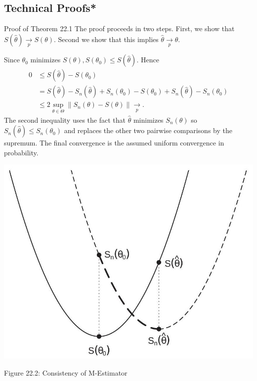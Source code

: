 \documentclass[10pt]{article}
\begin{document}
\subsection{Technical Proofs*}
Proof of Theorem 22.1 The proof proceeds in two steps. First, we show that $S(\widehat{\theta}) \underset{p}{\longrightarrow} S(\theta)$. Second we show that this implies $\widehat{\theta} \underset{p}{\longrightarrow} \theta$.

Since $\theta_{0}$ minimizes $S(\theta), S\left(\theta_{0}\right) \leq S(\widehat{\theta})$. Hence
$$
\begin{aligned}
0 & \leq S(\widehat{\theta})-S\left(\theta_{0}\right) \\
&=S(\widehat{\theta})-S_{n}(\widehat{\theta})+S_{n}\left(\theta_{0}\right)-S\left(\theta_{0}\right)+S_{n}(\widehat{\theta})-S_{n}\left(\theta_{0}\right) \\
& \leq 2 \sup _{\theta \in \Theta}\left\|S_{n}(\theta)-S(\theta)\right\| \underset{p}{\longrightarrow} .
\end{aligned}
$$
The second inequality uses the fact that $\hat{\theta}$ minimizes $S_{n}(\theta)$ so $S_{n}(\widehat{\theta}) \leq S_{n}\left(\theta_{0}\right)$ and replaces the other two pairwise comparisons by the supremum. The final convergence is the assumed uniform convergence in probability.

\includegraphics[max width=\textwidth]{2022_10_23_2c4fe6dc0800a1c87de2g-09}

Figure 22.2: Consistency of M-Estimator
\end{document}
